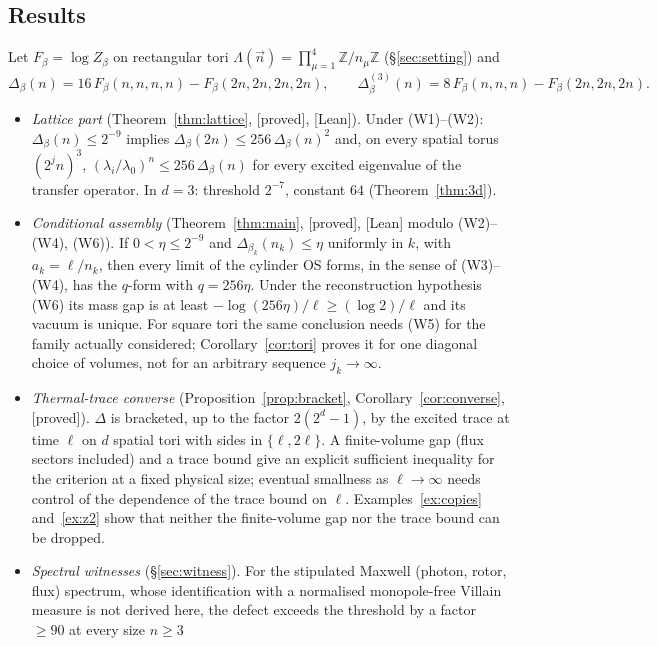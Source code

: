 \documentclass[11pt,a4paper]{article}
\theoremstyle{plain}
\theoremstyle{definition}
\theoremstyle{remark}
\numberwithin{equation}{section}
\newcommand{\Z}{\mathbb{Z}}
\newcommand{\st}[1]{\textsf{[#1]}}
\begin{document}
\subsection{Results}
Let $F_\beta=\log Z_\beta$ on rectangular tori $\Lambda(\vec n)=\prod_{\mu=1}^4\Z/n_\mu\Z$ (\S\ref{sec:setting}) and
\begin{equation}\label{eq:Delta}
\Delta_\beta(n)=16\,F_\beta(n,n,n,n)-F_\beta(2n,2n,2n,2n),\qquad
\Delta^{(3)}_\beta(n)=8\,F_\beta(n,n,n)-F_\beta(2n,2n,2n).
\end{equation}
\begin{itemize}
\item \emph{Lattice part} (Theorem~\ref{thm:lattice}, \st{proved}, \st{Lean}). Under (W1)--(W2): $\Delta_\beta(n)\le2^{-9}$ implies
$\Delta_\beta(2n)\le256\,\Delta_\beta(n)^2$ and, on every spatial torus $(2^jn)^3$, $(\lambda_i/\lambda_0)^n\le256\,\Delta_\beta(n)$ for
every excited eigenvalue of the transfer operator. In $d=3$: threshold $2^{-7}$, constant $64$ (Theorem~\ref{thm:3d}).
\item \emph{Conditional assembly} (Theorem~\ref{thm:main}, \st{proved}, \st{Lean} modulo (W2)--(W4), (W6)). If $0<\eta\le2^{-9}$ and
$\Delta_{\beta_k}(n_k)\le\eta$ uniformly in $k$, with $a_k=\ell/n_k$, then every limit of the cylinder OS forms, in the sense of (W3)--(W4), has
the $q$-form with $q=256\eta$. Under the reconstruction hypothesis (W6) its mass gap is at least $-\log(256\eta)/\ell\ge(\log2)/\ell$ and its
vacuum is unique. For square tori the same conclusion needs (W5) for the family actually considered; Corollary~\ref{cor:tori} proves it for one
diagonal choice of volumes, not for an arbitrary sequence $j_k\to\infty$.
\item \emph{Thermal-trace converse} (Proposition~\ref{prop:bracket}, Corollary~\ref{cor:converse}, \st{proved}). $\Delta$ is bracketed,
up to the factor $2(2^d-1)$, by the excited trace at time $\ell$ on $d$ spatial tori with sides in $\{\ell,2\ell\}$. A finite-volume gap
(flux sectors included) and a trace bound give an explicit sufficient inequality for the criterion at a fixed physical size; eventual
smallness as $\ell\to\infty$ needs control of the dependence of the trace bound on $\ell$. Examples~\ref{ex:copies} and~\ref{ex:z2} show that
neither the finite-volume gap nor the trace bound can be dropped.
\item \emph{Spectral witnesses} (\S\ref{sec:witness}). For the stipulated Maxwell (photon, rotor, flux) spectrum, whose identification
with a normalised monopole-free Villain measure is not derived here, the defect exceeds the threshold by a factor $\ge90$ at every size $n\ge3$

\end{itemize}
\end{document}

